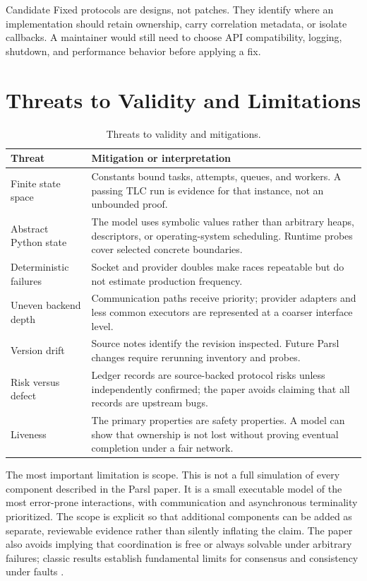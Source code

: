 \documentclass[11pt,a4paper]{article}
\newenvironment{tabularx}[2]{\begin{tabular}{#2}}{\end{tabular}}
\begin{document}
Candidate Fixed protocols are designs, not patches. They identify where an implementation should
retain ownership, carry correlation metadata, or isolate callbacks. A maintainer would still need
to choose API compatibility, logging, shutdown, and performance behavior before applying a fix.

\section{Threats to Validity and Limitations}
\begin{table}[h]
\centering
\caption{Threats to validity and mitigations.}\label{tab:threats}
\normalsize
\begin{tabularx}{\textwidth}{>{\raggedright\arraybackslash}p{0.25\textwidth} X}
\toprule
Threat & Mitigation or interpretation \\
\midrule
Finite state space & Constants bound tasks, attempts, queues, and workers. A passing TLC run is evidence for that instance, not an unbounded proof. \\
Abstract Python state & The model uses symbolic values rather than arbitrary heaps, descriptors, or operating-system scheduling. Runtime probes cover selected concrete boundaries. \\
Deterministic failures & Socket and provider doubles make races repeatable but do not estimate production frequency. \\
Uneven backend depth & Communication paths receive priority; provider adapters and less common executors are represented at a coarser interface level. \\
Version drift & Source notes identify the revision inspected. Future Parsl changes require rerunning inventory and probes. \\
Risk versus defect & Ledger records are source-backed protocol risks unless independently confirmed; the paper avoids claiming that all records are upstream bugs. \\
Liveness & The primary properties are safety properties. A model can show that ownership is not lost without proving eventual completion under a fair network. \\
\bottomrule
\end{tabularx}
\end{table}

The most important limitation is scope. This is not a full simulation of every component described in
the Parsl paper. It is a small executable model of the most error-prone interactions, with
communication and asynchronous terminality prioritized. The scope is explicit so that additional
components can be added as separate, reviewable evidence rather than silently inflating the claim.
The paper also avoids implying that coordination is free or always solvable under arbitrary failures;
classic results establish fundamental limits for consensus and consistency under faults
\cite{fischer1985impossibility,gilbert2002brewer}.
\end{document}
